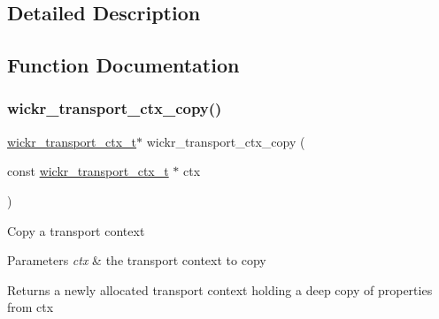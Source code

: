 \subsection{Detailed Description}


\subsection{Function Documentation}
\mbox{\label{group__wickr__transport__ctx_gaa49b2cf44bcb02d656598a17e5ae1c52}} 
\subsubsection{\texorpdfstring{wickr\+\_\+transport\+\_\+ctx\+\_\+copy()}{wickr\_transport\_ctx\_copy()}}
{\footnotesize\ttfamily \hyperlink{structwickr__transport__ctx}{wickr\+\_\+transport\+\_\+ctx\+\_\+t}$\ast$ wickr\+\_\+transport\+\_\+ctx\+\_\+copy (\begin{DoxyParamCaption}\item[{const \hyperlink{structwickr__transport__ctx}{wickr\+\_\+transport\+\_\+ctx\+\_\+t} $\ast$}]{ctx }\end{DoxyParamCaption})}

Copy a transport context


\begin{DoxyParams}{Parameters}
{\em ctx} & the transport context to copy \\
\hline
\end{DoxyParams}
\begin{DoxyReturn}{Returns}
a newly allocated transport context holding a deep copy of properties from \textquotesingle{}ctx\textquotesingle{} 
\end{DoxyReturn}
\mbox{\label{group__wickr__transport__ctx_ga4731758cf20b71d4469c74904bf662c0}} 

